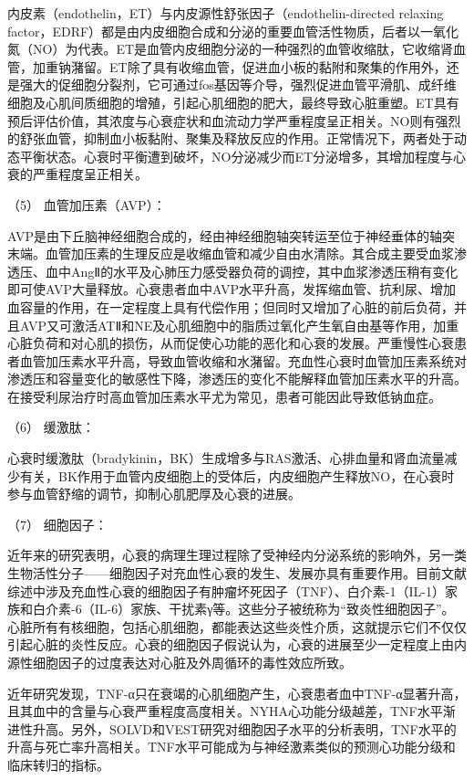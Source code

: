内皮素（endothelin，ET）与内皮源性舒张因子（endothelin-directed relaxing
factor，EDRF）都是由内皮细胞合成和分泌的重要血管活性物质，后者以一氧化氮（NO）为代表。ET是血管内皮细胞分泌的一种强烈的血管收缩肽，它收缩肾血管，加重钠潴留。ET除了具有收缩血管，促进血小板的黏附和聚集的作用外，还是强大的促细胞分裂剂，它可通过fos基因等介导，强烈促进血管平滑肌、成纤维细胞及心肌间质细胞的增殖，引起心肌细胞的肥大，最终导致心脏重塑。ET具有预后评估价值，其浓度与心衰症状和血流动力学严重程度呈正相关。NO则有强烈的舒张血管，抑制血小板黏附、聚集及释放反应的作用。正常情况下，两者处于动态平衡状态。心衰时平衡遭到破坏，NO分泌减少而ET分泌增多，其增加程度与心衰的严重程度呈正相关。

\hypertarget{text00072.htmlux5cux23CHP3-3-1-2-2-3-5}{}
（5） 血管加压素（AVP）：

AVP是由下丘脑神经细胞合成的，经由神经细胞轴突转运至位于神经垂体的轴突末端。血管加压素的生理反应是收缩血管和减少自由水清除。其合成主要受血浆渗透压、血中AngⅡ的水平及心肺压力感受器负荷的调控，其中血浆渗透压稍有变化即可使AVP大量释放。心衰患者血中AVP水平升高，发挥缩血管、抗利尿、增加血容量的作用，在一定程度上具有代偿作用；但同时又增加了心脏的前后负荷，并且AVP又可激活ATⅡ和NE及心肌细胞中的脂质过氧化产生氧自由基等作用，加重心脏负荷和对心肌的损伤，从而促使心功能的恶化和心衰的发展。严重慢性心衰患者血管加压素水平升高，导致血管收缩和水潴留。充血性心衰时血管加压素系统对渗透压和容量变化的敏感性下降，渗透压的变化不能解释血管加压素水平的升高。在接受利尿治疗时高血管加压素水平尤为常见，患者可能因此导致低钠血症。

\hypertarget{text00072.htmlux5cux23CHP3-3-1-2-2-3-6}{}
（6） 缓激肽：

心衰时缓激肽（bradykinin，BK）生成增多与RAS激活、心排血量和肾血流量减少有关，BK作用于血管内皮细胞上的受体后，内皮细胞产生释放NO，在心衰时参与血管舒缩的调节，抑制心肌肥厚及心衰的进展。

\hypertarget{text00072.htmlux5cux23CHP3-3-1-2-2-3-7}{}
（7） 细胞因子：

近年来的研究表明，心衰的病理生理过程除了受神经内分泌系统的影响外，另一类生物活性分子------细胞因子对充血性心衰的发生、发展亦具有重要作用。目前文献综述中涉及充血性心衰的细胞因子有肿瘤坏死因子（TNF）、白介素-1（IL-1）家族和白介素-6（IL-6）家族、干扰素γ等。这些分子被统称为“致炎性细胞因子”。心脏所有有核细胞，包括心肌细胞，都能表达这些炎性介质，这就提示它们不仅仅引起心脏的炎性反应。心衰的细胞因子假说认为，心衰的进展至少一定程度上由内源性细胞因子的过度表达对心脏及外周循环的毒性效应所致。

近年研究发现，TNF-α只在衰竭的心肌细胞产生，心衰患者血中TNF-α显著升高，且其血中的含量与心衰严重程度高度相关。NYHA心功能分级越差，TNF水平渐进性升高。另外，SOLVD和VEST研究对细胞因子水平的分析表明，TNF水平的升高与死亡率升高相关。TNF水平可能成为与神经激素类似的预测心功能分级和临床转归的指标。

